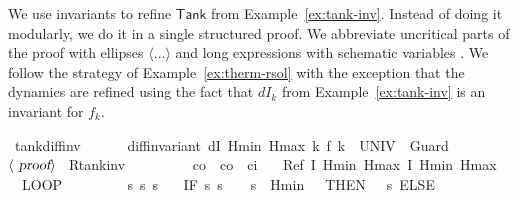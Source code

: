 \documentclass[envcountsame]{llncs}
\begin{document}
\begin{example}\label{ex:tank-rinv}
We use invariants to refine $\mathsf{Tank}$ from Example~\ref{ex:tank-inv}. Instead of doing it modularly, we do it in a single structured proof. We abbreviate uncritical parts of the proof with ellipses $\langle \dots\rangle$ and long expressions with schematic variables . We follow the strategy of Example~\ref{ex:therm-rsol} with the exception that the dynamics are refined using the fact that $dI_k$ from Example~\ref{ex:tank-inv} is an invariant for $f_k$.
\begin{isabellebody}
\isanewline
{}\isamarkupfalse%
\ tank{\isacharunderscore}diff{\isacharunderscore}inv{\isacharcolon}\isanewline
\ \ {\isachardoublequoteopen}{}\ {\isasymle}\ {\isasymtau}\ {\isasymLongrightarrow}\ diff{\isacharunderscore}invariant\ {\isacharparenleft}dI\ Hmin\ Hmax\ k{\isacharparenright}\ {\isacharparenleft}f\ k{\isacharparenright}\ {\isacharbraceleft}{}{\isachardot}{\isachardot}{\isasymtau}{\isacharbraceright}\ UNIV\ {}\ Guard{\isachardoublequoteclose}\isanewline
\ \ $\langle \isa{proof}\rangle$\isanewline
\isanewline
{}\isamarkupfalse%
\ R{\isacharunderscore}tank{\isacharunderscore}inv{\isacharcolon}\isanewline
\ \ \ {\isachardoublequoteopen}{}\ {\isasymle}\ {\isasymtau}{\isachardoublequoteclose}\ \ {\isachardoublequoteopen}{}\ {\isacharless}\ c\isactrlsub o{\isachardoublequoteclose}\ \ {\isachardoublequoteopen}c\isactrlsub o\ {\isacharless}\ c\isactrlsub i{\isachardoublequoteclose}\isanewline
\ \ \ {\isachardoublequoteopen}Ref\ {\isasymlceil}I\ Hmin\ Hmax{\isasymrceil}\ {\isasymlceil}I\ Hmin\ Hmax{\isasymrceil}\ {\isasymge}\isanewline
\ \ {\isacharparenleft}LOOP\ \isanewline
\ \ \ %
\isanewline
\ \ \ {\isacharparenleft}{\isacharparenleft}{}\ {\isacharcolon}{\isacharcolon}{\isacharequal}{\isacharparenleft}{\isasymlambda}s{\isachardot}{}{\isacharparenright}{\isacharparenright}{\isacharsemicolon}{\isacharparenleft}{}\ {\isacharcolon}{\isacharcolon}{\isacharequal}{\isacharparenleft}{\isasymlambda}s{\isachardot}\ s{\isachardollar}{}{\isacharparenright}{\isacharparenright}{\isacharsemicolon}\isanewline
\ \ \ {\isacharparenleft}IF\ {\isacharparenleft}{\isasymlambda}s{\isachardot}\ s{\isachardollar}{}\ {\isacharequal}\ {}\ {\isasymand}\ s{\isachardollar}{}\ {\isasymle}\ Hmin\ {\isacharplus}\ {}{\isacharparenright}\ THEN\ {\isacharparenleft}{}\ {\isacharcolon}{\isacharcolon}{\isacharequal}\ {\isacharparenleft}{\isasymlambda}s{\isachardot}{}{\isacharparenright}{\isacharparenright}\ ELSE\ \isanewline

\end{isabellebody}
\end{example}
\end{document}
